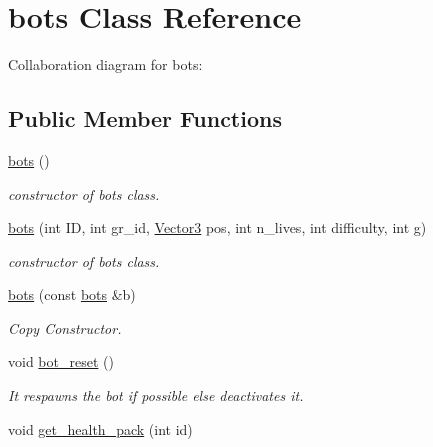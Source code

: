 \hypertarget{classbots}{\section{bots Class Reference}
\label{classbots}
}


Collaboration diagram for bots\+:
\subsection*{Public Member Functions}
\begin{DoxyCompactItemize}
\item 
\hypertarget{classbots_a1d428a5dcde2417e54fa13fa2415724a}{\hyperlink{classbots_a1d428a5dcde2417e54fa13fa2415724a}{bots} ()}\label{classbots_a1d428a5dcde2417e54fa13fa2415724a}

\begin{DoxyCompactList}\small\item\em constructor of bots class. \end{DoxyCompactList}\item 
\hyperlink{classbots_a0d70c5e37f51f8b7332fed15592e32bd}{bots} (int I\+D, int gr\+\_\+id, \hyperlink{class_vector3}{Vector3} pos, int n\+\_\+lives, int difficulty, int g)
\begin{DoxyCompactList}\small\item\em constructor of bots class. \end{DoxyCompactList}\item 
\hypertarget{classbots_a84f6e1b5953f357c2779555c18f4353c}{\hyperlink{classbots_a84f6e1b5953f357c2779555c18f4353c}{bots} (const \hyperlink{classbots}{bots} \&b)}\label{classbots_a84f6e1b5953f357c2779555c18f4353c}

\begin{DoxyCompactList}\small\item\em Copy Constructor. \end{DoxyCompactList}\item 
\hypertarget{classbots_af0fb461cedb0d93f6463872eb39acab3}{void \hyperlink{classbots_af0fb461cedb0d93f6463872eb39acab3}{bot\+\_\+reset} ()}\label{classbots_af0fb461cedb0d93f6463872eb39acab3}

\begin{DoxyCompactList}\small\item\em It respawns the bot if possible else deactivates it. \end{DoxyCompactList}\item 
\hypertarget{classbots_a0eb1d61d9cce692085f59f3448e3c578}{void \hyperlink{classbots_a0eb1d61d9cce692085f59f3448e3c578}{get\+\_\+health\+\_\+pack} (int id)}\label{classbots_a0eb1d61d9cce692085f59f3448e3c578}


\end{DoxyCompactItemize}
